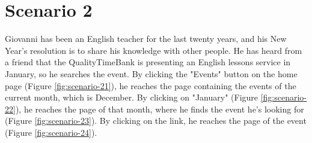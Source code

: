 \documentclass[a4paper, 11pt, parskip=half, headsepline]{scrreprt}
\begin{document}
\section{Scenario 2}	

Giovanni has been an English teacher for the last twenty years, and his New Year's resolution is to share his knowledge with other people. He has heard from a friend that the QualityTimeBank is presenting an English lessons service in January, so he searches the event. By clicking the "Events" button on the home page (Figure \ref{fig:scenario-21}), he reaches the page containing the events of the current month, which is December. By clicking on "January" (Figure \ref{fig:scenario-22}), he reaches the page of that month, where he finds the event he's looking for (Figure \ref{fig:scenario-23}). By clicking on the link, he reaches the page of the event (Figure \ref{fig:scenario-24}).
\end{document}
